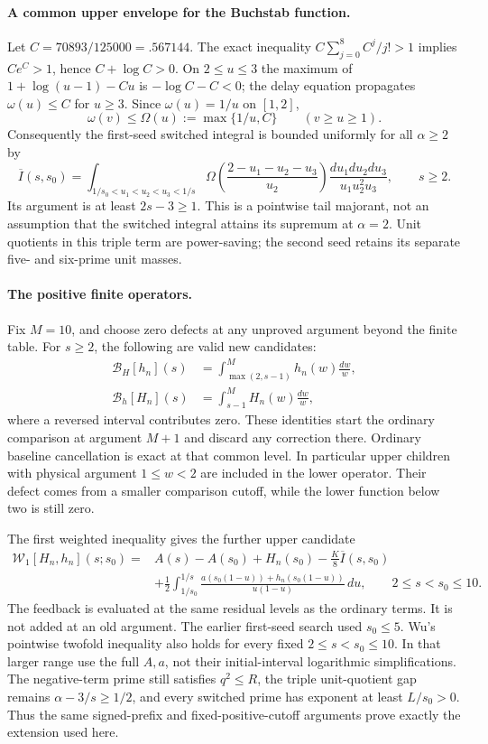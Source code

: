 \documentclass[11pt]{article}
\begin{document}
\paragraph{A common upper envelope for the Buchstab function.}
Let $C=70893/125000=.567144$. The exact inequality
$C\sum_{j=0}^{8}C^j/j!>1$ implies $Ce^C>1$, hence
$C+\log C>0$. On $2\le u\le3$ the maximum of
$1+\log(u-1)-Cu$ is $-\log C-C<0$; the delay equation propagates
$\omega(u)\le C$ for $u\ge3$. Since $\omega(u)=1/u$ on $[1,2]$,
\[
 \omega(v)\le\Omega(u):=\max\{1/u,C\}\qquad(v\ge u\ge1).
\]
Consequently the first-seed switched integral is bounded uniformly
for all $\alpha\ge2$ by
\[
 \overline I(s,s_0)=
 \int_{1/s_0<u_1<u_2<u_3<1/s}
 \Omega\!\left(\frac{2-u_1-u_2-u_3}{u_2}\right)
              \frac{du_1du_2du_3}{u_1u_2^2u_3},\qquad s\ge2.
\]
Its argument is at least $2s-3\ge1$. This is a pointwise tail
majorant, not an assumption that the switched integral attains its
supremum at $\alpha=2$. Unit quotients in this triple term are
power-saving; the second seed retains its separate five- and
six-prime unit masses.

\paragraph{The positive finite operators.}
Fix $M=10$, and choose zero defects at any unproved argument beyond
the finite table. For $s\ge2$, the following are valid new candidates:
\begin{align*}
 \mathcal B_H[h_n](s)&=\int_{\max(2,s-1)}^M h_n(w)\frac{dw}{w},\\
 \mathcal B_h[H_n](s)&=\int_{s-1}^M H_n(w)\frac{dw}{w},
\end{align*}
where a reversed interval contributes zero. These identities start
the ordinary comparison at argument $M+1$ and discard any correction
there. Ordinary baseline cancellation is exact at that common level.
In particular upper children with physical argument $1\le w<2$
are included in the lower operator. Their defect comes from a
smaller comparison cutoff, while the lower function below two is
still zero.

The first weighted inequality gives the further upper candidate
\begin{align*}
 \mathcal W_1[H_n,h_n](s;s_0)
 ={}& A(s)-A(s_0)+H_n(s_0)-\frac K8\overline I(s,s_0)\\
 &+\frac12\int_{1/s_0}^{1/s}
       \frac{a(s_0(1-u))+h_n(s_0(1-u))}{u(1-u)}\,du,
 \qquad 2\le s<s_0\le10.
\end{align*}
The feedback is evaluated at the same residual levels as the
ordinary terms. It is not added at an old argument.
The earlier first-seed search used $s_0\le5$. Wu's pointwise
twofold inequality also holds for every fixed $2\le s<s_0\le10$.
In that larger range use the full $A,a$, not their initial-interval
logarithmic simplifications. The negative-term prime still satisfies
$q^2\le R$, the triple unit-quotient gap remains
$\alpha-3/s\ge1/2$, and every switched prime has exponent at least
$L/s_0>0$. Thus the same signed-prefix and fixed-positive-cutoff
arguments prove exactly the extension used here.
\end{document}
